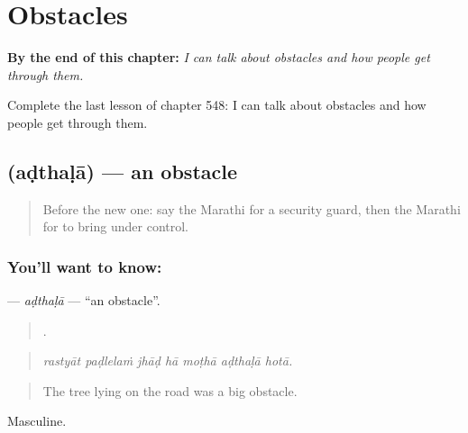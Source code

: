 
\chapter{Obstacles}
\label{ch:mr-obstacles}

\begin{chapteropening}
\textbf{By the end of this chapter:} \emph{I can talk about obstacles and how people get through them.}

Complete the last lesson of chapter 548: I can talk about obstacles and how people get through them.
\end{chapteropening}

\section[\texorpdfstring{\mr{अडथळा} (aḍthaḷā)}{अडथळा (aḍthaḷā)}]{ (aḍthaḷā) — an obstacle}

\label{lesson:MR-C548-adthala}



\begin{quote}
Before the new one: say the Marathi for a security guard, then the Marathi for to bring under control.
\end{quote}

\subsection*{You'll want to know: }
\textbf{} — \emph{aḍthaḷā} — \textquotedblleft{}an obstacle\textquotedblright{}.

\begin{quote}
      .
\end{quote}

\begin{quote}
\emph{rastyāt paḍlelaṁ jhāḍ hā moṭhā aḍthaḷā hotā.}
\end{quote}

\begin{quote}
The tree lying on the road was a big obstacle.
\end{quote}

Masculine.

